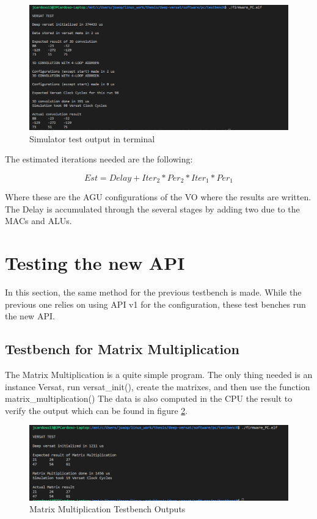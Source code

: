 \begin{figure}[!htbp]
    \centering
    \includegraphics[width=\textwidth]{Figures/test1.png}
    \caption{Simulator test output in terminal}
    \label{figure:test1}
\end{figure} 

The estimated iterations needed are the following:

\[ Est=Delay+Iter_2*Per_2*Iter_1*Per_1\]

Where these are the AGU configurations of the VO where the results are written. The Delay is accumulated
through the several stages by adding two due to the MACs and ALUs.

\section{Testing the new API}
\label{section:testgencov}

In this section, the same method for the previous testbench is made. 
While the previous one relies on using API v1 for the configuration, these test benches
run the new API. 

\subsection{Testbench for Matrix Multiplication}

The Matrix Multiplication is a quite simple program. The only thing needed is an instance
Versat, run versat\_init(), create the matrixes, and then use the function matrix\_multiplication()
The data is also computed in the CPU the result to verify the output which can be found in
figure \ref{figure:test2}.

\begin{figure}[!htbp]
    \centering
    \includegraphics[width=\textwidth]{Figures/test2.png}
    \caption{Matrix Multiplication Testbench Outputs}
    \label{figure:test2}
\end{figure}

